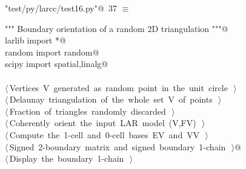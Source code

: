 \documentclass[11pt,oneside]{article}    %
\begin{document}
\begin{flushleft} \small \label{scrap59}
\protect{}\verb@"test/py/larcc/test16.py"@\nobreak\ {\footnotesize 37 }$\equiv$
\vspace{-1ex}
\begin{list}{}{} \item
\mbox{}\verb@""" Boundary orientation of a random 2D triangulation """@\\
\mbox{}\verb@from larlib import *@\\
\mbox{}\verb@from random import random@\\
\mbox{}\verb@from scipy import spatial,linalg@\\
\mbox{}\verb@@\\
\mbox{}\verb@@\hbox{$\langle\,$Vertices V generated as random point in the unit circle\nobreak\ {\footnotesize {}}$\,\rangle$}\verb@@\\
\mbox{}\verb@@\hbox{$\langle\,$Delaunay triangulation of the whole set V of points\nobreak\ {\footnotesize {}}$\,\rangle$}\verb@@\\
\mbox{}\verb@@\hbox{$\langle\,$Fraction of triangles randomly discarded\nobreak\ {\footnotesize {}}$\,\rangle$}\verb@@\\
\mbox{}\verb@@\hbox{$\langle\,$Coherently orient the input LAR model (V,FV)\nobreak\ {\footnotesize {}}$\,\rangle$}\verb@@\\
\mbox{}\verb@@\hbox{$\langle\,$Compute the 1-cell and 0-cell bases EV and VV\nobreak\ {\footnotesize {}}$\,\rangle$}\verb@@\\
\mbox{}\verb@@\hbox{$\langle\,$Signed 2-boundary matrix and signed boundary 1-chain\nobreak\ {\footnotesize {}}$\,\rangle$}\verb@    @\\
\mbox{}\verb@@\hbox{$\langle\,$Display the boundary 1-chain\nobreak\ {\footnotesize {}}$\,\rangle$}\verb@@\\
\mbox{}\verb@@{\NWsep}
\end{list}
\vspace{-2ex}
\end{flushleft}
\end{document}
